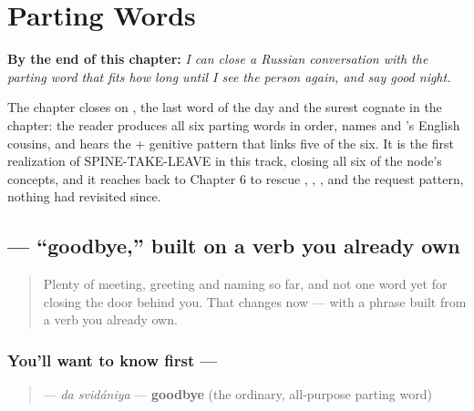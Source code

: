 
\chapter{Parting Words}
\label{ch:russian-parting-words}

\begin{chapteropening}
\textbf{By the end of this chapter:} \emph{I can close a Russian conversation with the parting word that fits how long until I see the person again, and say good night.}

The chapter closes on  , the last word of the day and the surest cognate in the chapter: the reader produces all six parting words in order, names  and 's English cousins, and hears the  + genitive pattern that links five of the six. It is the first realization of SPINE-TAKE-LEAVE in this track, closing all six of the node's concepts, and it reaches back to Chapter 6 to rescue , , ,  and the request pattern, nothing had revisited since.
\end{chapteropening}

\section[\texorpdfstring{\ru{до} \ru{свидания} (da svidániya)}{до свидания (da svidániya)}]{  — \textquotedblleft{}goodbye,\textquotedblright{} built on a verb you already own}

\label{lesson:RU-C11-do-svidaniya}



\begin{quote}
Plenty of meeting, greeting and naming so far, and not one word yet for closing the door behind you. That changes now — with a phrase built from a verb you already own.
\end{quote}

\subsection*{You'll want to know first —  }
\begin{quote}
\textbf{ } — \emph{da svidániya} — \textbf{goodbye} (the ordinary, all-purpose parting word)
\end{quote}

